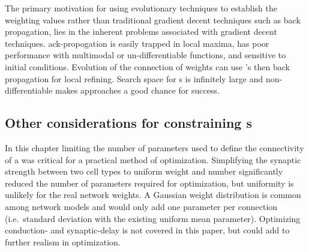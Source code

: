 The primary motivation for using evolutionary techniques to establish the
weighting values rather than traditional gradient decent techniques such as
back propagation, lies in the inherent problems associated with gradient
decent techniques. ack-propogation is easily trapped in local maxima, has
poor performance with multimodal or un-differentiable functions, and
sensitive to initial conditions. Evolution of the connection of weights can
use {\GA}'s then back propagation for local refining. Search space for {\BNN}s
is infinitely large and non-differentiable makes {\GA} approaches a good
chance for success.




\subsection{Other considerations for constraining {\BNN}s}\label{sec:GA:other-considerations}

In this chapter limiting the number of parameters used to define the
connectivity of a {\BNN} was critical for a practical method of
optimization. Simplifying the synaptic strength between two cell types to
uniform weight and number significantly reduced the number of parameters
required for optimization, but uniformity is unlikely for the real network
weights.  A Gaussian weight distribution is common among network models and
would only add one parameter per connection (i.e.\ standard deviation with
the existing uniform mean parameter).  Optimizing conduction- and
synaptic-delay is not covered in this paper, but could add to further
realism in {\BNN} optimization.

\smallskip{}

